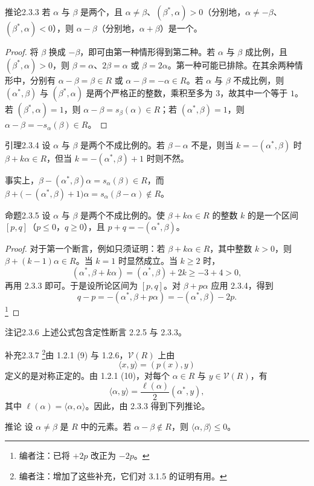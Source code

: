 \begin{SGAresult}{推论}{2.3.3}
若 $\alpha$ 与 $\beta$ 是两个，且 $\alpha\ne\beta$、$(\beta^*,\alpha)>0$（分别地，$\alpha\ne-\beta$、$(\beta^*,\alpha)<0$），则 $\alpha-\beta$（分别地，$\alpha+\beta$）是一个。
\end{SGAresult}
\begin{proof}
将 $\beta$ 换成 $-\beta$，即可由第一种情形得到第二种。若 $\alpha$ 与 $\beta$ 成比例，且 $(\beta^*,\alpha)>0$，则 $\beta=\alpha$、$2\beta=\alpha$ 或 $\beta=2\alpha$。第一种可能已排除。在其余两种情形中，分别有 $\alpha-\beta=\beta\in R$ 或 $\alpha-\beta=-\alpha\in R$。若 $\alpha$ 与 $\beta$ 不成比例，则 $(\alpha^*,\beta)$ 与 $(\beta^*,\alpha)$ 是两个严格正的整数，乘积至多为 $3$，故其中一个等于 $1$。若 $(\beta^*,\alpha)=1$，则 $\alpha-\beta=s_\beta(\alpha)\in R$；若 $(\alpha^*,\beta)=1$，则 $\alpha-\beta=-s_\alpha(\beta)\in R$。
\end{proof}
\begin{SGAresult}{引理}{2.3.4}
设 $\alpha$ 与 $\beta$ 是两个不成比例的。若 $\beta-\alpha$ 不是，则当 $k=-(\alpha^*,\beta)$ 时 $\beta+k\alpha\in R$，但当 $k=-(\alpha^*,\beta)+1$ 时则不然。
\end{SGAresult}
事实上，$\beta-(\alpha^*,\beta)\alpha=s_\alpha(\beta)\in R$，而 $\beta+\bigl(-(\alpha^*,\beta)+1\bigr)\alpha=s_\alpha(\beta-\alpha)\notin R$。
\begin{SGAresult}{命题}{2.3.5}
设 $\alpha$ 与 $\beta$ 是两个不成比例的。使 $\beta+k\alpha\in R$ 的整数 $k$ 的是一个区间 $[p,q]$（$p\leq0$，$q\geq0$），且 $p+q=-(\alpha^*,\beta)$。
\end{SGAresult}
\begin{proof}
对于第一个断言，例如只须证明：若 $\beta+k\alpha\in R$，其中整数 $k>0$，则 $\beta+(k-1)\alpha\in R$。当 $k=1$ 时显然成立。当 $k\geq2$ 时，
\[(\alpha^*,\beta+k\alpha)=(\alpha^*,\beta)+2k\geq-3+4>0,\]
再用 2.3.3 即可。于是设所论区间为 $[p,q]$。对 $\beta+p\alpha$ 应用 2.3.4，得到
\[q-p=-(\alpha^*,\beta+p\alpha)=-(\alpha^*,\beta)-2p.\]
\footnote{编者注：已将 $+2p$ 改正为 $-2p$。}
\end{proof}
\begin{SGAresult}{注记}{2.3.6}
上述公式包含定性断言 2.2.5 与 2.3.3。
\end{SGAresult}
\begin{SGAresult}{补充}{2.3.7}
\footnote{编者注：增加了这些补充，它们对 3.1.5 的证明有用。}由 1.2.1 (9) 与 1.2.6，$\mathscr V(R)$ 上由
\[\langle x,y\rangle=(p(x),y)\]
定义的是对称正定的。由 1.2.1 (10)，对每个 $\alpha\in R$ 与 $y\in\mathscr V(R)$，有
\[\langle\alpha,y\rangle=\frac{\ell(\alpha)}2(\alpha^*,y),\]
其中 $\ell(\alpha)=\langle\alpha,\alpha\rangle$。因此，由 2.3.3 得到下列推论。
\end{SGAresult}
\begin{SGAresult}{推论}{}
设 $\alpha\ne\beta$ 是 $R$ 中的元素。若 $\alpha-\beta\notin R$，则 $\langle\alpha,\beta\rangle\leq0$。
\end{SGAresult}

